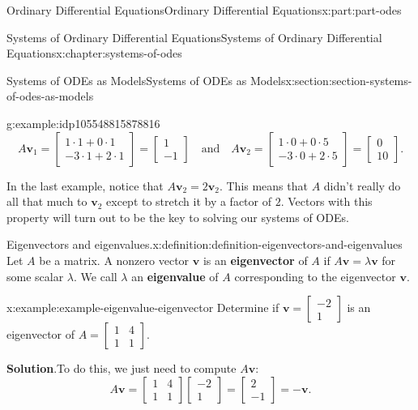 \documentclass[twoside,10pt,]{book}
\newcommand{\blocktitlefont}{\relax}
\newcommand{\terminology}[1]{\textbf{#1}}
\numberwithin{equation}{part}
\renewcommand{\vec}[1]{\mathbf{#1}}
\newcommand{\amp}{&}
\begin{document}
\begin{partptx}{Ordinary Differential Equations}{}{Ordinary Differential Equations}{}{}{x:part:part-odes}
\begin{chapterptx}{Systems of Ordinary Differential Equations}{}{Systems of Ordinary Differential Equations}{}{}{x:chapter:systems-of-odes}
\begin{sectionptx}{Systems of ODEs as Models}{}{Systems of ODEs as Models}{}{}{x:section:section-systems-of-odes-as-models}
\begin{example}{}{g:example:idp105548815878816}
\begin{equation*}
A\vec{v}_{1} = \begin{bmatrix}1\cdot1+0\cdot1\\-3\cdot1+2\cdot1\end{bmatrix} = \begin{bmatrix}1\\-1\end{bmatrix}\quad\text{and}\quad A\vec{v}_{2} = \begin{bmatrix}1\cdot0+0\cdot5\\-3\cdot0+2\cdot5\end{bmatrix} = \begin{bmatrix}0\\10\end{bmatrix}.
\end{equation*}
%
\end{example}
In the last example, notice that \(A\vec{v}_{2} = 2\vec{v}_{2}\). This means that \(A\) didn't really do all that much to \(\vec{v}_{2}\) except to stretch it by a factor of \(2\). Vectors with this property will turn out to be the key to solving our systems of ODEs.%
\begin{definition}{Eigenvectors and eigenvalues.}{x:definition:definition-eigenvectors-and-eigenvalues}%
Let \(A\) be a matrix. A nonzero vector \(\vec{v}\) is an \terminology{eigenvector} of \(A\) if \(A\vec{v} = \lambda\vec{v}\) for some scalar \(\lambda\). We call \(\lambda\) an \terminology{eigenvalue} of \(A\) corresponding to the eigenvector \(\vec{v}\).%
\end{definition}
\begin{example}{}{x:example:example-eigenvalue-eigenvector}%
Determine if \(\vec{v} = \begin{bmatrix}-2\\1\end{bmatrix}\) is an eigenvector of \(A = \begin{bmatrix}1\amp4\\1\amp1\end{bmatrix}\).%
\par\smallskip%
\noindent\textbf{\blocktitlefont Solution}.\hypertarget{g:solution:idp105548815856800}{}\quad{}To do this, we just need to compute \(A\vec{v}:\)%
\begin{equation*}
A\vec{v} = \begin{bmatrix}1\amp4\\1\amp1\end{bmatrix}\begin{bmatrix}-2\\1\end{bmatrix} = \begin{bmatrix}2\\-1\end{bmatrix} = -\vec{v}.

\end{equation*}
\end{example}
\end{sectionptx}
\end{chapterptx}
\end{partptx}
\end{document}

